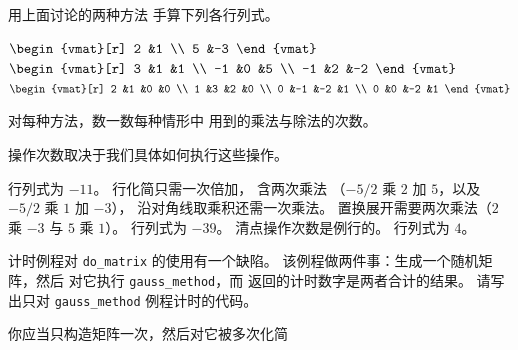 \begin{exercises}
\begin{answer}
    \end{answer}
  \item
    用上面讨论的两种方法
    手算下列各行列式。
    \begin{exparts*}
      \partsitem $\begin{vmat}[r]
                    2  &1  \\
                    5  &-3
                  \end{vmat}$
      \partsitem $\begin{vmat}[r]
                    3  &1  &1  \\
                   -1  &0  &5  \\
                   -1  &2  &-2
                  \end{vmat}$
      \partsitem $\begin{vmat}[r]
                    2  &1  &0  &0  \\
                    1  &3  &2  &0  \\
                    0  &-1 &-2 &1  \\
                    0  &0  &-2 &1
                  \end{vmat}$
    \end{exparts*}
    对每种方法，数一数每种情形中
    用到的乘法与除法的次数。
     \begin{answer}
       操作次数取决于我们具体如何执行这些操作。
       \begin{exparts}
         \partsitem 行列式为 $-11$。
           行化简只需一次倍加，
           含两次乘法
           （$-5/2$ 乘 $2$ 加 $5$，以及 $-5/2$ 乘 $1$ 加 $-3$），
           沿对角线取乘积还需一次乘法。
           置换展开需要两次乘法（$2$ 乘
           $-3$ 与 $5$ 乘 $1$）。
         \partsitem 行列式为 $-39$。
           清点操作次数是例行的。
         \partsitem 行列式为 $4$。
       \end{exparts}
     \end{answer}
  \item 计时例程对 \lstinline[style=inline]!do_matrix!
    的使用有一个缺陷。
    该例程做两件事：生成一个随机矩阵，然后
    对它执行 \lstinline[style=inline]!gauss_method!，而
    返回的计时数字是两者合计的结果。
    请写出只对
    \lstinline[style=inline]!gauss_method! 例程计时的代码。
    \begin{answer}
      你应当只构造矩阵一次，然后对它被多次化简

\end{answer}
\end{exercises}
